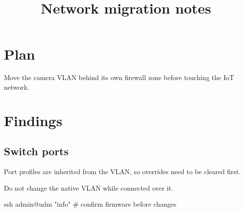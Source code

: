 \documentclass{jupiter-notes}
\title{Network migration notes}
\begin{document}
\maketitle
\section{Plan}
Move the camera VLAN behind its own firewall zone before touching the IoT network.

\begin{jptodo}
\end{jptodo}

\section{Findings}
\subsection{Switch ports}
Port profiles are inherited from the VLAN, so overrides need to be cleared first.
\begin{jpnote}[warn]Do not change the native VLAN while connected over it.\end{jpnote}
\begin{jpcode}
ssh admin@udm "info" # confirm firmware before changes
\end{jpcode}
\end{document}

